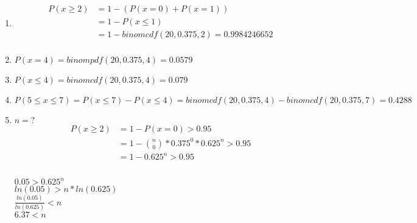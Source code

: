 \hfill \break
\begin{enumerate}
    \item \begin{align*}
              P(x\geq 2) & = 1- (P(x=0)+P(x=1))                     \\
                         & = 1- P(x \leq 1)                         \\
                         & = 1- binomcdf(20,0.375,2) = 0.9984246652 \\
          \end{align*}
    \item $P(x=4) = binompdf(20,0.375,4) = 0.0579$
    \item $P(x \leq 4) = binomcdf(20,0.375,4) = 0.079$
    \item $P(5 \leq x \leq 7) = P(x \leq 7) - P(x \leq 4) = binomcdf(20,0.375,4)-binomcdf(20,0.375,7) = 0.4288$
    \item $n=?$\\
          \begin{align*}
              P(x\geq 2) & = 1- P(x=0) > 0.95                           \\
                         & = 1- \binom{n}{0} * 0.375^0 * 0.625^n > 0.95 \\
                         & = 1 - 0.625^n > 0.95                         \\
          \end{align*}
          \\
          $0.05>0.625^n$                                              \\
          $ln(0.05) > n * ln(0.625)$                                  \\
          $\frac{ln(0.05)}{ln(0.625)} < n$                            \\
          $6.37 < n$                                                  \\
\end{enumerate}